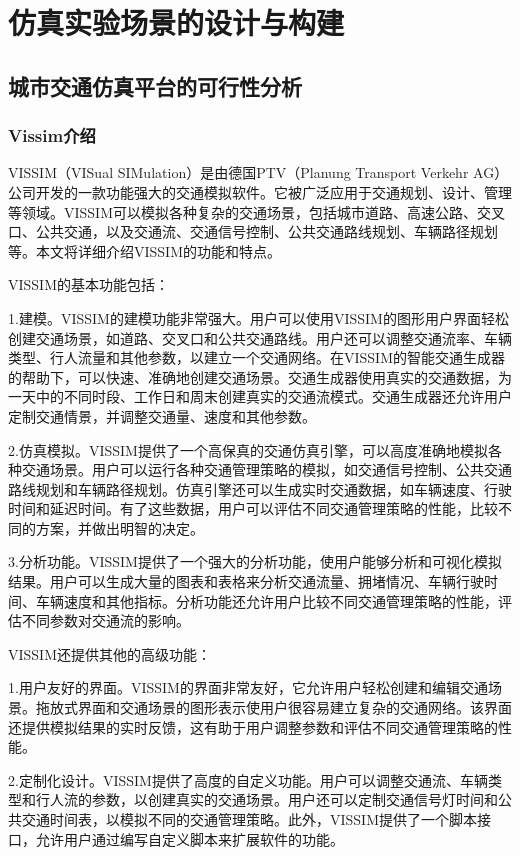 \chapter{仿真实验场景的设计与构建}

\section{城市交通仿真平台的可行性分析}

\subsection{Vissim介绍}

VISSIM（VISual SIMulation）是由德国PTV（Planung Transport Verkehr AG）公司开发的一款功能强大的交通模拟软件。它被广泛应用于交通规划、设计、管理等领域。VISSIM可以模拟各种复杂的交通场景，包括城市道路、高速公路、交叉口、公共交通，以及交通流、交通信号控制、公共交通路线规划、车辆路径规划等。本文将详细介绍VISSIM的功能和特点。

VISSIM的基本功能包括：

1.建模。VISSIM的建模功能非常强大。用户可以使用VISSIM的图形用户界面轻松创建交通场景，如道路、交叉口和公共交通路线。用户还可以调整交通流率、车辆类型、行人流量和其他参数，以建立一个交通网络。在VISSIM的智能交通生成器的帮助下，可以快速、准确地创建交通场景。交通生成器使用真实的交通数据，为一天中的不同时段、工作日和周末创建真实的交通流模式。交通生成器还允许用户定制交通情景，并调整交通量、速度和其他参数。

2.仿真模拟。VISSIM提供了一个高保真的交通仿真引擎，可以高度准确地模拟各种交通场景。用户可以运行各种交通管理策略的模拟，如交通信号控制、公共交通路线规划和车辆路径规划。仿真引擎还可以生成实时交通数据，如车辆速度、行驶时间和延迟时间。有了这些数据，用户可以评估不同交通管理策略的性能，比较不同的方案，并做出明智的决定。

3.分析功能。VISSIM提供了一个强大的分析功能，使用户能够分析和可视化模拟结果。用户可以生成大量的图表和表格来分析交通流量、拥堵情况、车辆行驶时间、车辆速度和其他指标。分析功能还允许用户比较不同交通管理策略的性能，评估不同参数对交通流的影响。

VISSIM还提供其他的高级功能：

1.用户友好的界面。VISSIM的界面非常友好，它允许用户轻松创建和编辑交通场景。拖放式界面和交通场景的图形表示使用户很容易建立复杂的交通网络。该界面还提供模拟结果的实时反馈，这有助于用户调整参数和评估不同交通管理策略的性能。

2.定制化设计。VISSIM提供了高度的自定义功能。用户可以调整交通流、车辆类型和行人流的参数，以创建真实的交通场景。用户还可以定制交通信号灯时间和公共交通时间表，以模拟不同的交通管理策略。此外，VISSIM提供了一个脚本接口，允许用户通过编写自定义脚本来扩展软件的功能。

